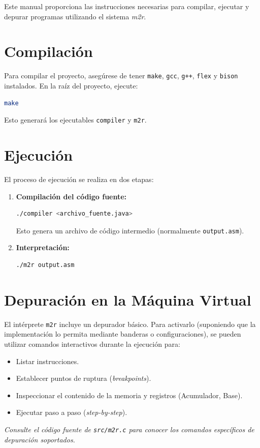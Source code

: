 Este manual proporciona las instrucciones necesarias para compilar, ejecutar y depurar programas utilizando el sistema \textit{m2r}.

\section{Compilación}
Para compilar el proyecto, asegúrese de tener \texttt{make}, \texttt{gcc}, \texttt{g++}, \texttt{flex} y \texttt{bison} instalados. En la raíz del proyecto, ejecute:
\begin{lstlisting}[language=bash]
make
\end{lstlisting}
Esto generará los ejecutables \texttt{compiler} y \texttt{m2r}.

\section{Ejecución}
El proceso de ejecución se realiza en dos etapas:
\begin{enumerate}
    \item \textbf{Compilación del código fuente:}
    \begin{lstlisting}[language=bash]
./compiler <archivo_fuente.java>
    \end{lstlisting}
    Esto genera un archivo de código intermedio (normalmente \texttt{output.asm}).
    
    \item \textbf{Interpretación:}
    \begin{lstlisting}[language=bash]
./m2r output.asm
    \end{lstlisting}
\end{enumerate}

\section{Depuración en la Máquina Virtual}
El intérprete \texttt{m2r} incluye un depurador básico. Para activarlo (suponiendo que la implementación lo permita mediante banderas o configuraciones), se pueden utilizar comandos interactivos durante la ejecución para:
\begin{itemize}
    \item Listar instrucciones.
    \item Establecer puntos de ruptura (\textit{breakpoints}).
    \item Inspeccionar el contenido de la memoria y registros (Acumulador, Base).
    \item Ejecutar paso a paso (\textit{step-by-step}).
\end{itemize}
\textit{Consulte el código fuente de \texttt{src/m2r.c} para conocer los comandos específicos de depuración soportados.}
